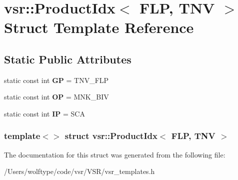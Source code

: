 \hypertarget{structvsr_1_1_product_idx_3_01_f_l_p_00_01_t_n_v_01_4}{\section{vsr\-:\-:Product\-Idx$<$ F\-L\-P, T\-N\-V $>$ Struct Template Reference}
\label{structvsr_1_1_product_idx_3_01_f_l_p_00_01_t_n_v_01_4}
}
\subsection*{Static Public Attributes}
\begin{DoxyCompactItemize}
\item 
\hypertarget{structvsr_1_1_product_idx_3_01_f_l_p_00_01_t_n_v_01_4_a4d9395b1d30018b806a11428047f59cc}{static const int {\bfseries G\-P} = T\-N\-V\-\_\-\-F\-L\-P}\label{structvsr_1_1_product_idx_3_01_f_l_p_00_01_t_n_v_01_4_a4d9395b1d30018b806a11428047f59cc}

\item 
\hypertarget{structvsr_1_1_product_idx_3_01_f_l_p_00_01_t_n_v_01_4_a21b7233a599dddec7538cff93f0a165b}{static const int {\bfseries O\-P} = M\-N\-K\-\_\-\-B\-I\-V}\label{structvsr_1_1_product_idx_3_01_f_l_p_00_01_t_n_v_01_4_a21b7233a599dddec7538cff93f0a165b}

\item 
\hypertarget{structvsr_1_1_product_idx_3_01_f_l_p_00_01_t_n_v_01_4_ab655ed9ddac1d07274a14232f12f7986}{static const int {\bfseries I\-P} = S\-C\-A}\label{structvsr_1_1_product_idx_3_01_f_l_p_00_01_t_n_v_01_4_ab655ed9ddac1d07274a14232f12f7986}

\end{DoxyCompactItemize}
\subsubsection*{template$<$$>$ struct vsr\-::\-Product\-Idx$<$ F\-L\-P, T\-N\-V $>$}



The documentation for this struct was generated from the following file\-:\begin{DoxyCompactItemize}
\item 
/\-Users/wolftype/code/vsr/\-V\-S\-R/vsr\-\_\-templates.\-h\end{DoxyCompactItemize}
